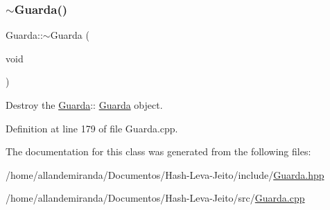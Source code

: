 \subsubsection{\texorpdfstring{$\sim$\+Guarda()}{~Guarda()}}
{\footnotesize\ttfamily Guarda\+::$\sim$\+Guarda (\begin{DoxyParamCaption}\item[{void}]{ }\end{DoxyParamCaption})}



Destroy the \hyperlink{class_guarda}{Guarda}\+:\+: \hyperlink{class_guarda}{Guarda} object. 



Definition at line 179 of file Guarda.\+cpp.



The documentation for this class was generated from the following files\+:\begin{DoxyCompactItemize}
\item 
/home/allandemiranda/\+Documentos/\+Hash-\/\+Leva-\/\+Jeito/include/\hyperlink{_guarda_8hpp}{Guarda.\+hpp}\item 
/home/allandemiranda/\+Documentos/\+Hash-\/\+Leva-\/\+Jeito/src/\hyperlink{_guarda_8cpp}{Guarda.\+cpp}\end{DoxyCompactItemize}
